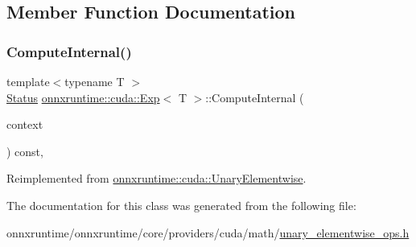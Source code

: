 \subsection{Member Function Documentation}
\mbox{\label{classonnxruntime_1_1cuda_1_1Exp_a311efdccc5969833cb43fa07058186d0}} 
\subsubsection{\texorpdfstring{Compute\+Internal()}{ComputeInternal()}}
{\footnotesize\ttfamily template$<$typename T $>$ \\
\mbox{\hyperlink{classonnxruntime_1_1common_1_1Status}{Status}} \mbox{\hyperlink{classonnxruntime_1_1cuda_1_1Exp}{onnxruntime\+::cuda\+::\+Exp}}$<$ T $>$\+::Compute\+Internal (\begin{DoxyParamCaption}\item[{\mbox{\hyperlink{classonnxruntime_1_1OpKernelContext}{Op\+Kernel\+Context}} $\ast$}]{context }\end{DoxyParamCaption}) const\hspace{0.3cm}{\ttfamily [override]}, {\ttfamily [virtual]}}



Reimplemented from \mbox{\hyperlink{classonnxruntime_1_1cuda_1_1UnaryElementwise_abbbcb29c3937e2ac9e2ad768d9c69fca}{onnxruntime\+::cuda\+::\+Unary\+Elementwise}}.



The documentation for this class was generated from the following file\+:\begin{DoxyCompactItemize}
\item 
onnxruntime/onnxruntime/core/providers/cuda/math/\mbox{\hyperlink{unary__elementwise__ops_8h}{unary\+\_\+elementwise\+\_\+ops.\+h}}\end{DoxyCompactItemize}
